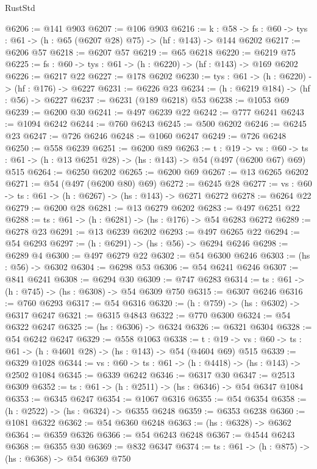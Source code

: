 \begin{lexlean}{RustStd}
\begin{coremodule}
@6206 := @141 @903
@6207 := @106 @903
@6216 := {k : @58} ->
  {fs : @60} -> {tys : @61} -> (h : @65 (@6207 @28) @75) -> (hf : @143) -> @144 @6202
@6217 := @6206 @57
@6218 := @6207 @57
@6219 := @65 @6218
@6220 := @6219 @75
@6225 := {fs : @60} -> {tys : @61} -> (h : @6220) -> (hf : @143) -> @169 @6202
@6226 := @6217 @22
@6227 := @178 @6202
@6230 := {tys : @61} -> (h : @6220) -> (hf : @176) -> @6227
@6231 := @6226 @23
@6234 := (h : @6219 @184) -> (hf : @56) -> @6227
@6237 := @6231 (@189 @6218) @53
@6238 := @1053 @69
@6239 := @6200 @30
@6241 := @497 @6239 @22
@6242 := @777 @6241
@6243 := @1094 @6242
@6244 := @760 @6243
@6245 := @500 @6202
@6246 := @6245 @23
@6247 := @726 @6246
@6248 := @1060 @6247
@6249 := @726 @6248
@6250 := @558 @6239
@6251 := @6200 @89
@6263 := {t : @19} ->
  {vs : @60} -> {ts : @61} -> (h : @13 @6251 @28) -> (hs : @143) -> @54 (@497 (@6200 @67) @69) @515
@6264 := @6250 @6202
@6265 := @6200 @69
@6267 := @13 @6265 @6202
@6271 := @54 (@497 (@6200 @80) @69)
@6272 := @6245 @28
@6277 := {vs : @60} -> {ts : @61} -> (h : @6267) -> (hs : @143) -> @6271 @6272
@6278 := @6264 @22
@6279 := @6200 @28
@6281 := @13 @6279 @6202
@6283 := @497 @6251 @22
@6288 := {ts : @61} -> (h : @6281) -> (hs : @176) -> @54 @6283 @6272
@6289 := @6278 @23
@6291 := @13 @6239 @6202
@6293 := @497 @6265 @22
@6294 := @54 @6293
@6297 := (h : @6291) -> (hs : @56) -> @6294 @6246
@6298 := @6289 @4
@6300 := @497 @6279 @22
@6302 := @54 @6300 @6246
@6303 := (hs : @56) -> @6302
@6304 := @6298 @53
@6306 := @54 @6241 @6246
@6307 := @841 @6241
@6308 := @6294 @30
@6309 := @747 @6283
@6314 := {ts : @61} -> (h : @745) -> (hs : @6308) -> @54 @6309 @750
@6315 := @6307 @6246
@6316 := @760 @6293
@6317 := @54 @6316
@6320 := (h : @759) -> (hs : @6302) -> @6317 @6247
@6321 := @6315 @4843
@6322 := @770 @6300
@6324 := @54 @6322 @6247
@6325 := (hs : @6306) -> @6324
@6326 := @6321 @6304
@6328 := @54 @6242 @6247
@6329 := @558 @1063
@6338 := {t : @19} ->
  {vs : @60} -> {ts : @61} -> (h : @4601 @28) -> (hs : @143) -> @54 (@4604 @69) @515
@6339 := @6329 @1028
@6344 := {vs : @60} -> {ts : @61} -> (h : @4418) -> (hs : @143) -> @2502 @1084
@6345 := @6339 @6242
@6346 := @6317 @30
@6347 := @2513 @6309
@6352 := {ts : @61} -> (h : @2511) -> (hs : @6346) -> @54 @6347 @1084
@6353 := @6345 @6247
@6354 := @1067 @6316
@6355 := @54 @6354
@6358 := (h : @2522) -> (hs : @6324) -> @6355 @6248
@6359 := @6353 @6238
@6360 := @1081 @6322
@6362 := @54 @6360 @6248
@6363 := (hs : @6328) -> @6362
@6364 := @6359 @6326
@6366 := @54 @6243 @6248
@6367 := @4544 @6243
@6368 := @6355 @30
@6369 := @832 @6347
@6374 := {ts : @61} -> (h : @875) -> (hs : @6368) -> @54 @6369 @750

\end{coremodule}
\end{lexlean}
